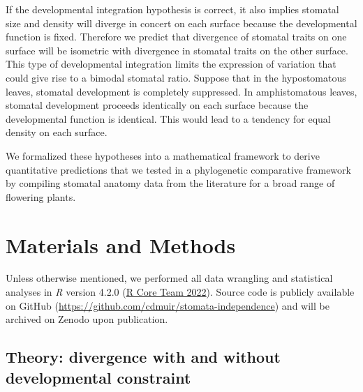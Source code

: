 \documentclass[
  12pt,
]{article}
\begin{document}

If the developmental integration hypothesis is correct, it also implies stomatal size and density will diverge in concert on each surface because the developmental function is fixed. Therefore we predict that divergence of stomatal traits on one surface will be isometric with divergence in stomatal traits on the other surface. This type of developmental integration limits the expression of variation that could give rise to a bimodal stomatal ratio. Suppose that in the hypostomatous leaves, stomatal development is completely suppressed. In amphistomatous leaves, stomatal development proceeds identically on each surface because the developmental function is identical. This would lead to a tendency for equal density on each surface.

We formalized these hypotheses into a mathematical framework to derive quantitative predictions that we tested in a phylogenetic comparative framework by compiling stomatal anatomy data from the literature for a broad range of flowering plants.

\hypertarget{materials-and-methods}{%
\section{Materials and Methods}\label{materials-and-methods}}

Unless otherwise mentioned, we performed all data wrangling and statistical analyses in \emph{R} version 4.2.0 (\protect\hyperlink{ref-r_core_team_r:_2022}{R Core Team 2022}). Source code is publicly available on GitHub (\url{https://github.com/cdmuir/stomata-independence}) and will be archived on Zenodo upon publication.

\hypertarget{theory-divergence-with-and-without-developmental-constraint}{%
\subsection{Theory: divergence with and without developmental constraint}\label{theory-divergence-with-and-without-developmental-constraint}}
\end{document}
